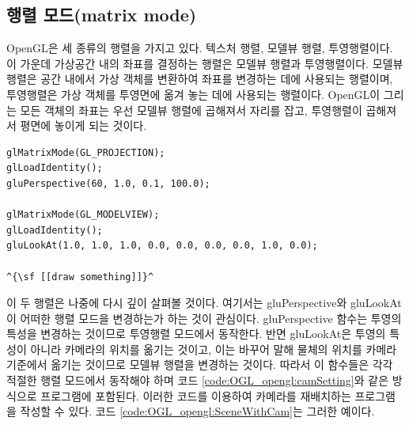 \subsection{행렬 모드(matrix mode)}

 
OpenGL은 세 종류의 행렬을 가지고 있다. 텍스처 행렬, 모델뷰 행렬, 투영행렬이다. 이 가운데 가상공간 내의 좌표를 결정하는 행렬은 모델뷰 행렬과 투영행렬이다. 모델뷰 행렬은 공간 내에서 가상 객체를 변환하여 좌표를 변경하는 데에 사용되는 행렬이며, 투영행렬은 가상 객체를 투영면에 옮겨 놓는 데에 사용되는 행렬이다. OpenGL이 그리는 모든 객체의 좌표는 우선 모델뷰 행렬에 곱해져서 자리를 잡고, 투영행렬이 곱해져서 평면에 놓이게 되는 것이다. 

\begin{algorithmbis}\label{code:OGL_opengl:camSetting}
\lstset{language=C++, escapechar=^} 
\begin{lstlisting}
glMatrixMode(GL_PROJECTION);
glLoadIdentity();
gluPerspective(60, 1.0, 0.1, 100.0);

glMatrixMode(GL_MODELVIEW);
glLoadIdentity();
gluLookAt(1.0, 1.0, 1.0, 0.0, 0.0, 0.0, 0.0, 1.0, 0.0);

^{\sf [[draw something]]}^
\end{lstlisting}
\end{algorithmbis}

이 두 행렬은 나중에 다시 깊이 살펴볼 것이다. 여기서는 {\sf gluPerspective}와 {\sf gluLookAt}이 어떠한 행렬 모드을 변경하는가 하는 것이 관심이다. {\sf gluPerspective} 함수는 투영의 특성을 변경하는 것이므로 투영행렬 모드에서 동작한다. 반면 {\sf gluLookAt}은 투영의 특성이 아니라 카메라의 위치를 옮기는 것이고, 이는 바꾸어 말해 물체의 위치를 카메라 기준에서 옮기는 것이므로 모델뷰 행렬을 변경하는 것이다. 따라서 이 함수들은 각각 적절한 행렬 모드에서 동작해야 하며 코드 \ref{code:OGL_opengl:camSetting}와 같은 방식으로 프로그램에 포함된다. 이러한 코드를 이용하여 카메라를 재배치하는 프로그램을 작성할 수 있다. 코드 \ref{code:OGL_opengl:SceneWithCam}는 그러한 예이다.

